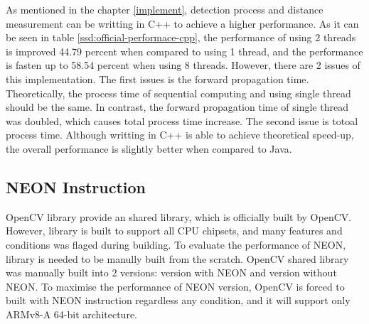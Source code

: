             As mentioned in the chapter \ref{implement},
            detection process and distance measurement can be writting in C++ to achieve a higher performance.
            As it can be seen in table \ref{ssd:official-performace-cpp},
            the performance of using 2 threads is improved 44.79 percent when compared to using 1 thread,
            and the performance is fasten up to 58.54 percent when using 8 threads.
            However, there are 2 issues of this implementation.
            The first issues is the forward propagation time.
                Theoretically, the process time of sequential computing and using single thread should be the same.
                In contrast, the forward propagation time of single thread was doubled,
                which causes total process time increase.
            The second issue is totoal process time.
                Although writting in C++ is able to achieve theoretical speed-up,
                the overall performance is slightly better when compared to Java.

        \subsection{NEON Instruction}
            OpenCV library provide an shared library, which is officially built by OpenCV.
            However, library is built to support all CPU chipsets, and many features and conditions was flaged during building.
            To evaluate the performance of NEON, library is needed to be manully built from the scratch.
            OpenCV shared library was manually built into 2 versions: version with NEON and version without NEON.
            To maximise the performance of NEON version, OpenCV is forced to built with NEON instruction regardless any condition,
            and it will support only ARMv8-A 64-bit architecture.

